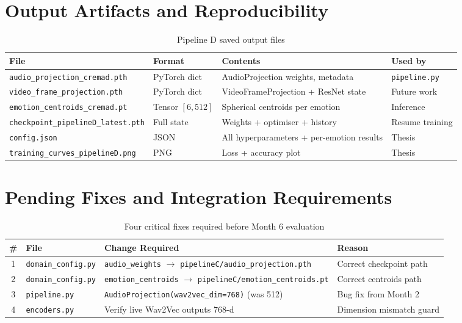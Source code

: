 \documentclass[12pt,a4paper]{article}
\theoremstyle{definition}
\theoremstyle{remark}
\begin{document}
\section{Output Artifacts and Reproducibility}

\begin{table}[H]
\centering
\caption{Pipeline D saved output files}
\begin{tabularx}{\textwidth}{llXl}
\toprule
File & Format & Contents & Used by \\
\midrule
\texttt{audio\_projection\_cremad.pth} & PyTorch dict & AudioProjection weights, metadata & \texttt{pipeline.py} \\
\texttt{video\_frame\_projection.pth}  & PyTorch dict & VideoFrameProjection + ResNet state & Future work \\
\texttt{emotion\_centroids\_cremad.pt} & Tensor $[6,512]$ & Spherical centroids per emotion & Inference \\
\texttt{checkpoint\_pipelineD\_latest.pth} & Full state & Weights + optimiser + history & Resume training \\
\texttt{config.json}                   & JSON & All hyperparameters + per-emotion results & Thesis \\
\texttt{training\_curves\_pipelineD.png} & PNG & Loss + accuracy plot & Thesis \\
\bottomrule
\end{tabularx}
\end{table}

\section{Pending Fixes and Integration Requirements}

\begin{table}[H]
\centering
\caption{Four critical fixes required before Month 6 evaluation}
\begin{tabularx}{\textwidth}{clXl}
\toprule
\# & File & Change Required & Reason \\
\midrule
1 & \texttt{domain\_config.py} & \texttt{audio\_weights} $\to$
    \texttt{pipelineC/audio\_projection.pth} & Correct checkpoint path \\
2 & \texttt{domain\_config.py} & \texttt{emotion\_centroids} $\to$
    \texttt{pipelineC/emotion\_centroids.pt} & Correct centroids path \\
3 & \texttt{pipeline.py} & \texttt{AudioProjection(wav2vec\_dim=768)}
    (was 512) & Bug fix from Month 2 \\
4 & \texttt{encoders.py} & Verify live Wav2Vec outputs 768-d & Dimension mismatch guard \\
\bottomrule
\end{tabularx}
\end{table}
\end{document}
